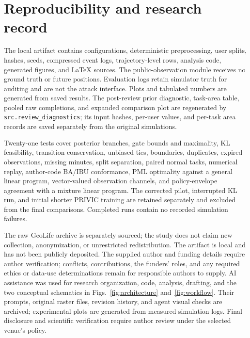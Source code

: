 \documentclass[3p,times]{elsarticle}
\begin{document}
\section{Reproducibility and research record}
The local artifact contains configurations, deterministic preprocessing, user splits, hashes, seeds, compressed event logs, trajectory-level rows, analysis code, generated figures, and LaTeX sources. The public-observation module receives no ground truth or future positions. Evaluation logs retain simulator truth for auditing and are not the attack interface. Plots and tabulated numbers are generated from saved results. The post-review prior diagnostic, task-area table, pooled raw completions, and expanded comparison plot are regenerated by \texttt{src.review\_diagnostics}; its input hashes, per-user values, and per-task area records are saved separately from the original simulations.

Twenty-one tests cover posterior branches, gate bounds and maximality, KL feasibility, transition conservation, unbiased ties, boundaries, duplicates, expired observations, missing minutes, split separation, paired normal tasks, numerical replay, author-code BA/IBU conformance, PML optimality against a general linear program, vector-valued observation channels, and policy-envelope agreement with a mixture linear program. The corrected pilot, interrupted KL run, and initial shorter PRIVIC training are retained separately and excluded from the final comparisons. Completed runs contain no recorded simulation failures.

The raw GeoLife archive is separately sourced; the study does not claim new collection, anonymization, or unrestricted redistribution. The artifact is local and has not been publicly deposited. The supplied author and funding details require author verification; conflicts, contributions, the funders' roles, and any required ethics or data-use determinations remain for responsible authors to supply. AI assistance was used for research organization, code, analysis, drafting, and the two conceptual schematics in Figs.~\ref{fig:architecture} and~\ref{fig:workflow}. Their prompts, original raster files, revision history, and agent visual checks are archived; experimental plots are generated from measured simulation logs. Final disclosure and scientific verification require author review under the selected venue's policy.
\end{document}
